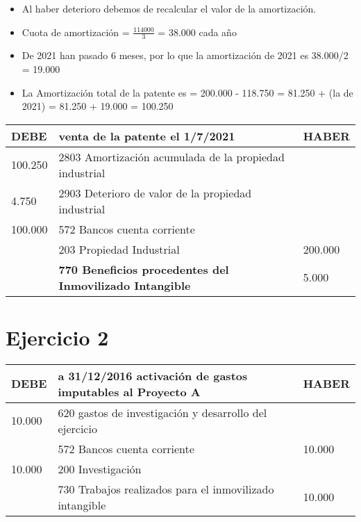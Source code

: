 \documentclass[a4paper,12pt]{article}
\newcommand{\fec}{31/12/}
\newcommand{\bancos}{572 Bancos cuenta corriente}
\newcommand{\cuotaamort}{Cuota de amortización = }
\newcommand{\myequation}[2]{\ensuremath{\frac{#1}{#2}}}
\begin{document}
\begin{itemize}
    \item Al haber deterioro debemos de recalcular el valor de la amortización.
    \item \cuotaamort \myequation{114000}{3} = 38.000 cada año
    \item De 2021 han pasado 6 meses, por lo que la amortización de 2021 es 38.000/2 = 19.000
    \item La Amortización total de la patente es = 200.000 - 118.750 = 81.250 + (la de 2021) = 81.250 + 19.000 = 100.250 
\end{itemize}

\begin{table}[H]
    \centering
    \begin{tabular}{|p{3cm}|p{6cm}|p{3cm}|}
    \hline
    \textbf{DEBE} & \textbf{venta de la patente el 1/7/2021} & \textbf{HABER} \\
    \hline
    100.250 & 2803 Amortización acumulada de la propiedad industrial& \\
    \hline
    4.750 & 2903 Deterioro de valor de la propiedad industrial& \\
    \hline
    100.000& \bancos & \\
    \hline
    & 203 Propiedad Industrial& 200.000\\
    \hline
    & \textbf{770 Beneficios procedentes del Inmovilizado Intangible}& 5.000\\
    \hline
    \end{tabular}
\end{table}

\section{Ejercicio 2}

\begin{table}[H]
    \centering
    \begin{tabular}{|p{3cm}|p{6cm}|p{3cm}|}
    \hline
    \textbf{DEBE} & \textbf{a \fec2016 activación de gastos imputables al Proyecto A} & \textbf{HABER} \\
    \hline
    10.000 & 620 gastos de investigación y desarrollo del ejercicio& \\
    \hline
    & \bancos & 10.000\\
    \hline
    10.000& 200 Investigación& \\
    \hline
    & 730 Trabajos realizados para el inmovilizado intangible&  10.000\\
    \hline
    \end{tabular}
\end{table}
\end{document}

